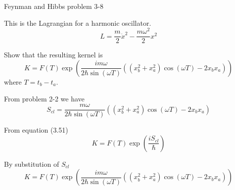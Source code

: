 \documentclass[12pt]{article}
\begin{document}
\begin{center}
Feynman and Hibbs problem 3-8
\end{center}

This is the Lagrangian for a harmonic oscillator.
\begin{equation*}
L=\frac{m}{2}\dot x^2-\frac{m\omega^2}{2}x^2
\end{equation*}

Show that the resulting kernel is
\begin{equation*}
K=F(T)\exp\left(
\frac{im\omega}{2\hbar\sin(\omega T)}
\left((x_b^2+x_a^2)\cos(\omega T)-2x_b x_a\right)
\right)
\end{equation*}
where $T=t_b-t_a$.

\bigskip
From problem 2-2 we have
\begin{equation*}
S_{cl}=\frac{m\omega}{2\hbar\sin(\omega T)}
\left((x_b^2+x_a^2)\cos(\omega T)-2x_b x_a\right)
\end{equation*}

From equation (3.51)
\begin{equation*}
K=F(T)\exp\left(
\frac{iS_{cl}}{\hbar}
\right)
\end{equation*}

By substitution of $S_{cl}$
\begin{equation*}
K=F(T)\exp\left(
\frac{im\omega}{2\hbar\sin(\omega T)}
\left((x_b^2+x_a^2)\cos(\omega T)-2x_b x_a\right)
\right)
\end{equation*}
\end{document}
